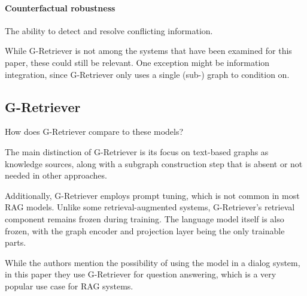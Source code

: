 \paragraph{Counterfactual robustness} The ability to detect and resolve conflicting information.

While G-Retriever is not among the systems that have been examined for this paper, these could still be relevant.
One exception might be information integration, since G-Retriever only uses a single (sub-) graph to condition on.



\subsection{G-Retriever}

How does G-Retriever compare to these models?

The main distinction of G-Retriever is its focus on text-based graphs as knowledge sources, along with a subgraph construction step that is absent or not needed in other approaches.

Additionally, G-Retriever employs prompt tuning, which is not common in most RAG models.
Unlike some retrieval-augmented systems, G-Retriever's retrieval component remains frozen during training.
The language model itself is also frozen, with the graph encoder and projection layer being the only trainable parts.

While the authors mention the possibility of using the model in a dialog system, in this paper they use G-Retriever for question answering, which is a very popular use case for RAG systems.
